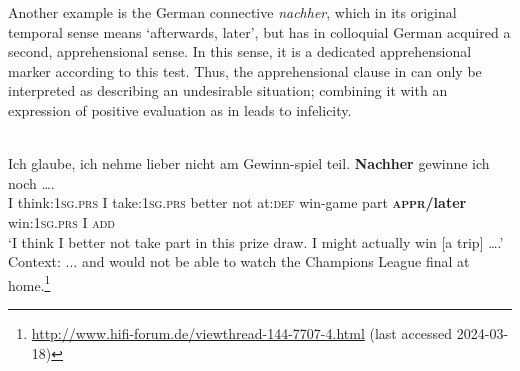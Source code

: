 \documentclass[output=paper,colorlinks,citecolor=brown
]{langscibook}
\begin{document}
 Another example is the German connective \textit{nachher}, which in its original temporal sense means `afterwards, later', but has in colloquial German acquired a second, apprehensional sense. In this sense, it is a dedicated apprehensional marker according to this test. Thus, the apprehensional clause in  can only be interpreted as describing an undesirable situation; combining it with an expression of positive evaluation as in  leads to infelicity.

\ea \label{ex:intro17} 
\\
\ea \label{ex:intro17a}
\gll Ich glaube, ich nehme lieber nicht am Gewinn-spiel	teil. \textbf{Nachher} gewinne ich noch \ldots. \\
I think:\textsc{1sg.prs} I take:\textsc{1sg.prs} better not at:\textsc{def} win-game part \textsc{\textbf{appr/}}\textbf{later} win:\textsc{1sg.prs} I \textsc{add} \\
\glt `I think I better not take part in this prize draw. I might actually win [a trip] \ldots.' \\
Context: $\ldots$ and would not be able to watch the Champions League final at home.\footnote{\url{http://www.hifi-forum.de/viewthread-144-7707-4.html} (last accessed 2024-03-18)} \\
\z
\z
\end{document}
